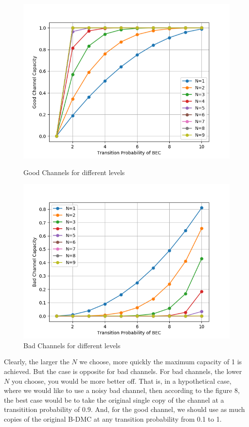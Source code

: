 \documentclass{article}
\begin{document}
\begin{figure}[H]
\centering
\begin{minipage}{0.49\textwidth}
\includegraphics[width=\linewidth]{good_channels.png}
\caption{Good Channels for different levels}
\end{minipage}
\begin{minipage}{0.49\textwidth}
\includegraphics[width=\linewidth]{bad_channels.png}
\caption{Bad Channels for different levels}
\end{minipage}
\end{figure}
Clearly, the larger the $N$ we choose, more quickly the maximum capacity of 1 is achieved. But the case is opposite for bad channels. For bad channels, the lower $N$ you choose, you would be more better off. That is, in a hypothetical case, where we would like to use a noisy bad channel, then according to the figure 8, the best case would be to take the original single copy of the channel at a transitition probability of 0.9. And, for the good channel, we should use as much copies of the original B-DMC at any transition probability from 0.1 to 1.
\end{document}
